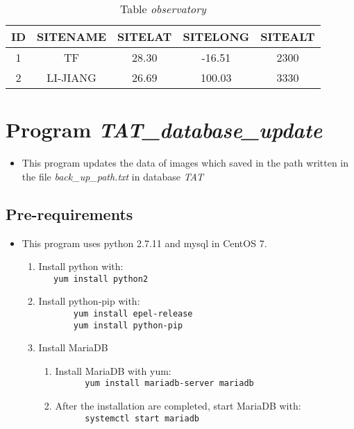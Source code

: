 \documentclass[12pt]{article}    %
\begin{document}
 \begin{table}[!htbp]
  \centering
  \caption{Table {\it observatory}}
  \begin{tabular}{|*{5}{c|}}
   \hline
   ID & SITENAME & SITELAT & SITELONG & SITEALT \\ \hline
   1 & TF & 28.30 & -16.51 & 2300 \\ \hline    
   2 & LI-JIANG & 26.69 & 100.03 & 3330 \\ \hline 
  \end{tabular}
 \end{table}

 \newpage
	
 \section{Program {\it TAT\_database\_update}}
 \begin{itemize}
  \item This program updates the data of images which saved in the path written in the file {\it back\_up\_path.txt} in database {\it TAT}
 \end{itemize}
 
 \subsection{Pre-requirements}
 \begin{itemize}
  \item This program uses python 2.7.11 and mysql in CentOS 7.
  \begin{enumerate}
   \item Install python with:\\
   \verb|	yum install python2|
   \item Install python-pip with:\\
   \verb|		yum install epel-release|\\
   \verb|		yum install python-pip| 
   \item Install MariaDB
  
   \begin{enumerate}[itemindent=1pt,label=(\arabic*)]
    \item Install MariaDB with yum:\\
    \verb|		yum install mariadb-server mariadb|
    \item After the installation are completed, start MariaDB with:\\
    \verb|		systemctl start mariadb|    
   \end{enumerate}
  \end{enumerate}
 \end{itemize}
\end{document}
